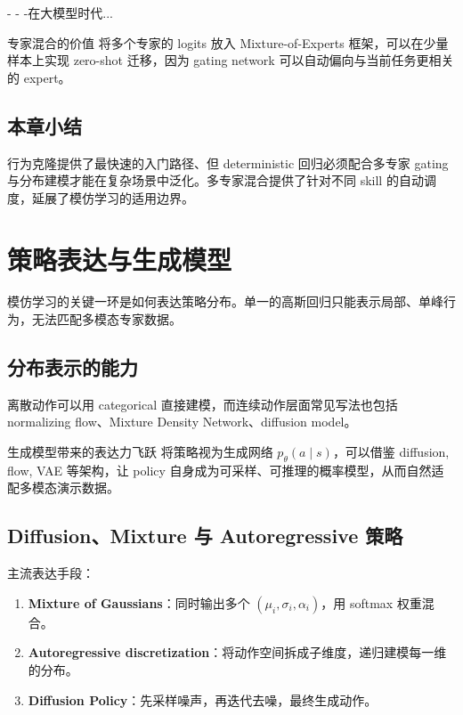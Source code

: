 \documentclass[a4paper]{article}
\begin{document}
-
-
-在大模型时代...

\begin{knowledgebox}{专家混合的价值}
将多个专家的 logits 放入 Mixture-of-Experts 框架，可以在少量样本上实现 zero-shot 迁移，因为 gating network 可以自动偏向与当前任务更相关的 expert。
\end{knowledgebox}

\subsection{本章小结}

行为克隆提供了最快速的入门路径、但 deterministic 回归必须配合多专家 gating 与分布建模才能在复杂场景中泛化。多专家混合提供了针对不同 skill 的自动调度，延展了模仿学习的适用边界。

\section{策略表达与生成模型}

模仿学习的关键一环是如何表达策略分布。单一的高斯回归只能表示局部、单峰行为，无法匹配多模态专家数据。

\subsection{分布表示的能力}

离散动作可以用 categorical 直接建模，而连续动作层面常见写法也包括 normalizing flow、Mixture Density Network、diffusion model。

\begin{importantbox}{生成模型带来的表达力飞跃}
将策略视为生成网络 $p_\theta(a \mid s)$，可以借鉴 diffusion, flow, VAE 等架构，让 policy 自身成为可采样、可推理的概率模型，从而自然适配多模态演示数据。
\end{importantbox}

\subsection{Diffusion、Mixture 与 Autoregressive 策略}

主流表达手段：
\begin{enumerate}
    \item \textbf{Mixture of Gaussians}：同时输出多个 $(\mu_i, \sigma_i, \alpha_i)$，用 softmax 权重混合。
    \item \textbf{Autoregressive discretization}：将动作空间拆成子维度，递归建模每一维的分布。
    \item \textbf{Diffusion Policy}：先采样噪声，再迭代去噪，最终生成动作。
\end{enumerate}
\end{document}
